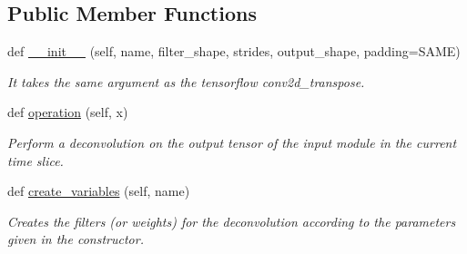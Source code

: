 \subsection*{Public Member Functions}
\begin{DoxyCompactItemize}
\item 
\mbox{\label{classmodules_1_1_conv2_d_transpose_module_acdba05e0c793a743336082c4778ef125}} 
def \hyperlink{classmodules_1_1_conv2_d_transpose_module_acdba05e0c793a743336082c4778ef125}{\+\_\+\+\_\+init\+\_\+\+\_\+} (self, name, filter\+\_\+shape, strides, output\+\_\+shape, padding=\textquotesingle{}S\+A\+ME\textquotesingle{})
\begin{DoxyCompactList}\small\item\em It takes the same argument as the tensorflow conv2d\+\_\+transpose. \end{DoxyCompactList}\item 
def \hyperlink{classmodules_1_1_conv2_d_transpose_module_a39b975d02ff419a91c3e5e9addd5aa18}{operation} (self, x)
\begin{DoxyCompactList}\small\item\em Perform a deconvolution on the output tensor of the input module in the current time slice. \end{DoxyCompactList}\item 
\mbox{\label{classmodules_1_1_conv2_d_transpose_module_af4d9c9bcb7a6e234a40d8027e64456e8}} 
def \hyperlink{classmodules_1_1_conv2_d_transpose_module_af4d9c9bcb7a6e234a40d8027e64456e8}{create\+\_\+variables} (self, name)
\begin{DoxyCompactList}\small\item\em Creates the filters (or weights) for the deconvolution according to the parameters given in the constructor. \end{DoxyCompactList}\end{DoxyCompactItemize}
